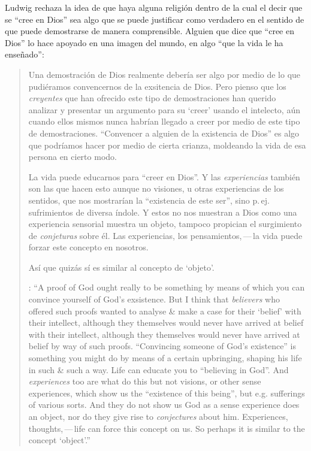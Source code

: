   Ludwig rechaza la idea de que haya alguna religión dentro de la cual el decir que se ``cree en Dios'' sea algo que se puede justificar como verdadero en el sentido de que puede demostrarse de manera comprensible. Alguien que dice que ``cree en Dios'' lo hace apoyado en una imagen del mundo, en algo ``que la vida le ha enseñado'': \blockquote[{\cite[97]{wittgenstein1998cnv}}: \enquote{A proof of God ought really to be something by means of which you can convince yourself of God's exsistence. But I think that \emph{believers} who offered such proofs wanted to analyse \& make a case for their `belief' with their intellect, although they themselves would never have arrived at belief with their intellect, although they themselves would never have arrived at belief by way of such proofs. ``Convincing someone of God's existence'' is something you might do by means of a certain upbringing, shaping his life in such \& such a way.
  Life can educate you to ``believing in God''. And \emph{experiences} too are what do this but not visions, or other sense experiences, which show us the ``existence of this being'', but e.g. sufferings of various sorts. And they do not show us God as a sense experience does an object, nor do they give rise to \emph{conjectures} about him. Experiences, thoughts,\,---\,life can force this concept on us.
  So perhaps it is similar to the concept `object'.}]{Una demostración de Dios realmente debería ser algo por medio de lo que pudiéramos convencernos de la exsitencia de Dios. Pero pienso que los \emph{creyentes} que han ofrecido este tipo de demostraciones han querido analizar y presentar un argumento para su `creer' usando el intelecto, aún cuando ellos mismos nunca habrían llegado a creer por medio de este tipo de demostraciones. ``Convencer a alguien de la existencia de Dios'' es algo que podríamos hacer por medio de cierta crianza, moldeando la vida de esa persona en cierto modo.

  La vida puede educarnos para ``creer en Dios''. Y las \emph{experiencias} también son las que hacen esto aunque no visiones, u otras experiencias de los sentidos, que nos mostrarían la ``existencia de este ser'', sino p.\,ej. sufrimientos de diversa índole. Y estos no nos muestran a Dios como una experiencia sensorial muestra un objeto, tampoco propician el surgimiento de \emph{conjeturas} sobre él. Las experiencias, los pensamientos,\,---\,la vida puede forzar este concepto en nosotros.

  Así que quizás sí es similar al concepto de `objeto'.}

